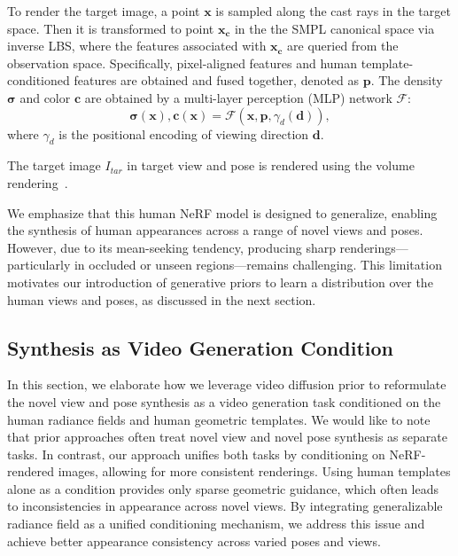 To render the target image, a point $\bm{x}$ is sampled along the cast rays in the target space. Then it is transformed to point $\bm{x_c}$ in the the SMPL canonical space via inverse LBS, where the features associated with $\bm{x_c}$ are queried from the observation space. Specifically, pixel-aligned features and human template-conditioned features are obtained and fused together, denoted as $\bm{p}$. The density $\bm{\sigma}$ and color $\bm{c}$ are obtained by a multi-layer perception
(MLP) network $\mathcal{F}$:
\begin{equation}
    \bm{\sigma}(\bm{x}), \bm{c}(\bm{x}) = \mathcal{F}(\bm{x}, \bm{p}, \gamma_d(\bm{d})),
\end{equation}
where $\gamma_d$ is the positional encoding of viewing direction $\bm{d}$.

The target image $I_{tar}$ in target view and pose is rendered using the volume rendering~\cite{mildenhall2021nerf}.

We emphasize that this human NeRF model is designed to generalize, enabling the synthesis of human appearances across a range of novel views and poses. 
%
However, due to its mean-seeking tendency, producing sharp renderings—particularly in occluded or unseen regions—remains challenging. 
This limitation motivates our introduction of generative priors to learn a distribution over the human views and poses, as discussed in the next section.

\subsection{Synthesis as Video Generation Condition}
In this section, we elaborate how we leverage video diffusion prior to reformulate the novel view and pose synthesis as a video generation task conditioned on the human radiance fields and human geometric templates. We would like to note that prior approaches often treat novel view and novel pose synthesis as separate tasks. In contrast, our approach unifies both tasks by conditioning on NeRF-rendered images, allowing for more consistent renderings. Using human templates alone as a condition provides only sparse geometric guidance, which often leads to inconsistencies in appearance across novel views. By integrating generalizable radiance field as a unified conditioning mechanism, we address this issue and achieve better appearance consistency across varied poses and views.


